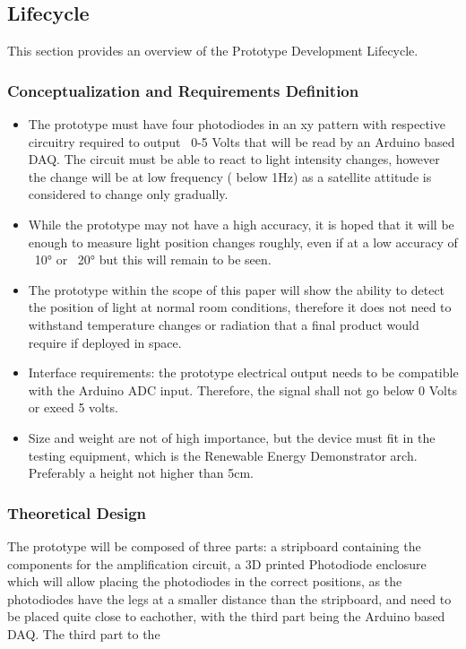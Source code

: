 \subsection{Lifecycle}
This section provides an overview of the Prototype Development Lifecycle.

\subsubsection*{Conceptualization and Requirements Definition}
\begin{itemize}
  \item The prototype must have four photodiodes in an xy pattern with respective circuitry required to output ~0-5 Volts that will be read by an Arduino based \ac{DAQ}. The circuit must be able to react to light intensity changes, however the change will be at low frequency ( below 1Hz) as a satellite attitude is considered to change only gradually.
  \item While the prototype may not have a high accuracy, it is hoped that it will be enough to measure light position changes roughly, even if at a low accuracy of ~10° or ~20° but this will remain to be seen.  
  \item The prototype within the scope of this paper will show the ability to detect the position of light at normal room conditions, therefore it does not need to withstand temperature changes or radiation that a final product would require if deployed in space.
  \item Interface requirements: the prototype electrical output needs to be compatible with the Arduino \ac{ADC} input. Therefore, the signal shall not go below 0 Volts or exeed 5 volts. 
  \item Size and weight are not of high importance, but the device must fit in the testing equipment, which is the Renewable Energy Demonstrator arch. Preferably a height not higher than 5cm.
\end{itemize}

\subsubsection*{Theoretical Design}
The prototype will be composed of three parts: a stripboard containing the components for the amplification circuit,  a 3D printed Photodiode enclosure which will allow placing the photodiodes in the correct positions, as the photodiodes have the legs at a smaller distance than the stripboard, and need to be placed quite close to eachother, with the third part being the Arduino based DAQ. 
%
The third part to the 


